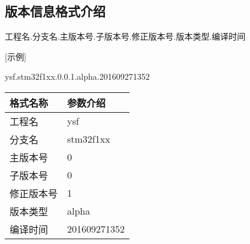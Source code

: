 \subsection{版本信息格式介绍}
\begin{center}
工程名.分支名.主版本号.子版本号.修正版本号.版本类型.编译时间\\
\end{center}

[示例]
\begin{center}
ysf.stm32f1xx.0.0.1.alpha.201609271352
\end{center}

\begin{center}
	\begin{tabular}{|p{5cm}|p{5cm}|}  
		\hline
		格式名称 & 参数介绍 \\ \hline
		工程名 & ysf \\ \hline
		分支名 & stm32f1xx \\ \hline
		主版本号 & 0 \\ \hline
		子版本号 & 0 \\ \hline
		修正版本号 & 1 \\ \hline
		版本类型 & alpha \\ \hline
		编译时间 & 201609271352 \\ \hline
	\end{tabular}
\end{center}